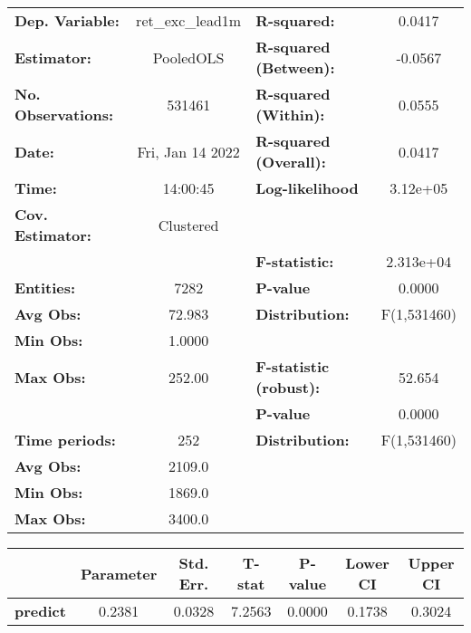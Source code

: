 \begin{center}
\begin{tabular}{lclc}
\toprule
\textbf{Dep. Variable:}    &  ret\_exc\_lead1m  & \textbf{  R-squared:         }   &      0.0417      \\
\textbf{Estimator:}        &     PooledOLS      & \textbf{  R-squared (Between):}  &     -0.0567      \\
\textbf{No. Observations:} &       531461       & \textbf{  R-squared (Within):}   &      0.0555      \\
\textbf{Date:}             &  Fri, Jan 14 2022  & \textbf{  R-squared (Overall):}  &      0.0417      \\
\textbf{Time:}             &      14:00:45      & \textbf{  Log-likelihood     }   &     3.12e+05     \\
\textbf{Cov. Estimator:}   &     Clustered      & \textbf{                     }   &                  \\
\textbf{}                  &                    & \textbf{  F-statistic:       }   &    2.313e+04     \\
\textbf{Entities:}         &        7282        & \textbf{  P-value            }   &      0.0000      \\
\textbf{Avg Obs:}          &       72.983       & \textbf{  Distribution:      }   &   F(1,531460)    \\
\textbf{Min Obs:}          &       1.0000       & \textbf{                     }   &                  \\
\textbf{Max Obs:}          &       252.00       & \textbf{  F-statistic (robust):} &      52.654      \\
\textbf{}                  &                    & \textbf{  P-value            }   &      0.0000      \\
\textbf{Time periods:}     &        252         & \textbf{  Distribution:      }   &   F(1,531460)    \\
\textbf{Avg Obs:}          &       2109.0       & \textbf{                     }   &                  \\
\textbf{Min Obs:}          &       1869.0       & \textbf{                     }   &                  \\
\textbf{Max Obs:}          &       3400.0       & \textbf{                     }   &                  \\
\bottomrule
\end{tabular}
\begin{tabular}{lcccccc}
                 & \textbf{Parameter} & \textbf{Std. Err.} & \textbf{T-stat} & \textbf{P-value} & \textbf{Lower CI} & \textbf{Upper CI}  \\
\midrule
\textbf{predict} &       0.2381       &       0.0328       &      7.2563     &      0.0000      &       0.1738      &       0.3024       \\
\bottomrule
\end{tabular}
\end{center}
